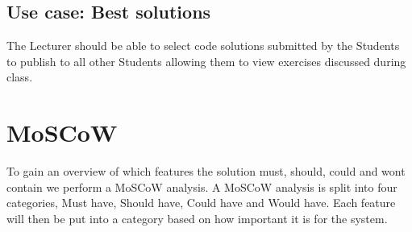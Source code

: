 \subsection*{Use case: Best solutions} 
The Lecturer should be able to select code solutions submitted by the Students to publish to all other Students allowing them to view exercises discussed during class.

\section{MoSCoW}

To gain an overview of which features the solution must, should, could and wont contain we perform a MoSCoW analysis.
A MoSCoW analysis is split into four categories, Must have, Should have, Could have and Would have. Each feature will then be put into a category based on how important it is for the system. 

